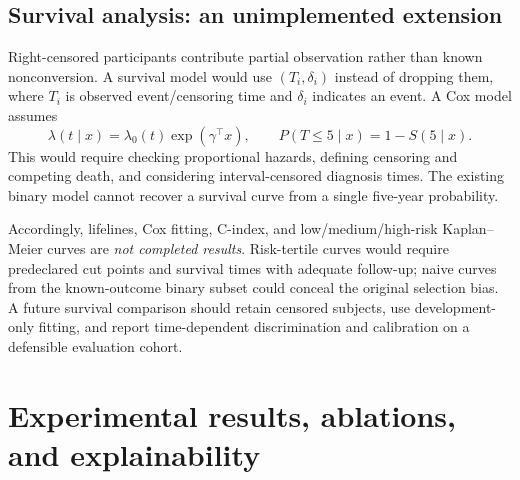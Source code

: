 \documentclass[11pt,a4paper]{article}
\begin{document}
\subsection{Survival analysis: an unimplemented extension}
Right-censored participants contribute partial observation rather than known nonconversion. A survival model would use $(T_i,\delta_i)$ instead of dropping them, where $T_i$ is observed event/censoring time and $\delta_i$ indicates an event. A Cox model assumes
\begin{equation}\lambda(t\mid x)=\lambda_0(t)\exp(\gamma^\top x),\qquad P(T\leq5\mid x)=1-S(5\mid x).\end{equation}
This would require checking proportional hazards, defining censoring and competing death, and considering interval-censored diagnosis times. The existing binary model cannot recover a survival curve from a single five-year probability.

Accordingly, lifelines, Cox fitting, C-index, and low/medium/high-risk Kaplan--Meier curves are \emph{not completed results}. Risk-tertile curves would require predeclared cut points and survival times with adequate follow-up; naive curves from the known-outcome binary subset could conceal the original selection bias. A future survival comparison should retain censored subjects, use development-only fitting, and report time-dependent discrimination and calibration on a defensible evaluation cohort.

\clearpage
\section{Experimental results, ablations, and explainability}
\end{document}
